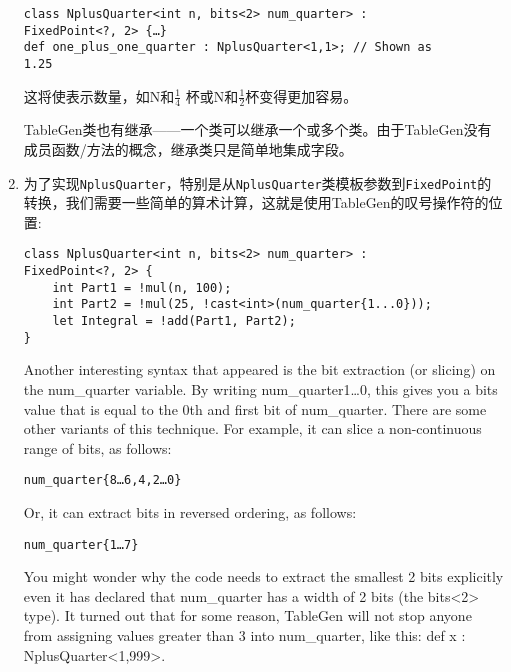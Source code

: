 \begin{enumerate}
\begin{lstlisting}[style=styleCXX]
class NplusQuarter<int n, bits<2> num_quarter> :
FixedPoint<?, 2> {…}
def one_plus_one_quarter : NplusQuarter<1,1>; // Shown as
1.25
\end{lstlisting}

这将使表示数量，如N和$\frac{1}{4}$ 杯或N和$\frac{1}{2}$杯变得更加容易。

TableGen类也有继承——一个类可以继承一个或多个类。由于TableGen没有成员函数/方法的概念，继承类只是简单地集成字段。

\item 为了实现\texttt{NplusQuarter}，特别是从\texttt{NplusQuarter}类模板参数到\texttt{FixedPoint}的转换，我们需要一些简单的算术计算，这就是使用TableGen的叹号操作符的位置:

\begin{lstlisting}[style=styleCXX]
class NplusQuarter<int n, bits<2> num_quarter> :
FixedPoint<?, 2> {
	int Part1 = !mul(n, 100);
	int Part2 = !mul(25, !cast<int>(num_quarter{1...0}));
	let Integral = !add(Part1, Part2);
}
\end{lstlisting}

Another interesting syntax that appeared is the bit extraction (or slicing) on the num\_quarter variable. By writing num\_quarter{1…0}, this gives you a bits value that is equal to the 0th and first bit of num\_quarter. There are some other variants of this technique. For example, it can slice a non-continuous range of bits, as follows:

\begin{lstlisting}[style=styleCXX]
num_quarter{8…6,4,2…0}
\end{lstlisting}

Or, it can extract bits in reversed ordering, as follows:

\begin{lstlisting}[style=styleCXX]
num_quarter{1…7}
\end{lstlisting}

\begin{tcolorbox}[colback=blue!5!white,colframe=blue!75!black, fonttitle=\bfseries,title=Note]
\hspace*{0.7cm}You might wonder why the code needs to extract the smallest 2 bits explicitly even it has declared that num\_quarter has a width of 2 bits (the bits<2> type). It turned out that for some reason, TableGen will not stop anyone from assigning values greater than 3 into num\_quarter, like this: def x : NplusQuarter<1,999>.
\end{tcolorbox}


\end{enumerate}
